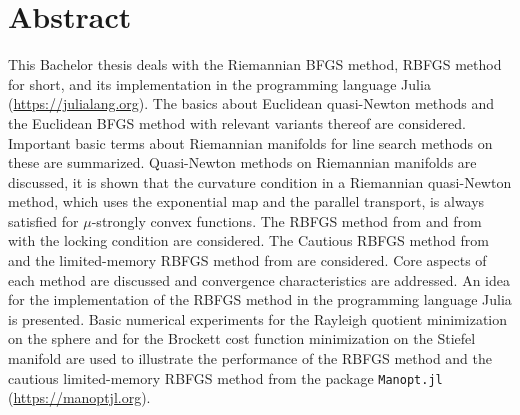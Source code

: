 \chapter*{Abstract}

This Bachelor thesis deals with the Riemannian BFGS method, RBFGS method for short, and its implementation in the programming language Julia (\url{https://julialang.org}). The basics about Euclidean quasi-Newton methods and the Euclidean BFGS method with relevant variants thereof are considered. Important basic terms about Riemannian manifolds for line search methods on these are summarized. Quasi-Newton methods on Riemannian manifolds are discussed, it is shown that the curvature condition in a Riemannian quasi-Newton method, which uses the exponential map and the parallel transport, is always satisfied for $\mu$-strongly convex functions. The RBFGS method from \cite{Qi:2011} and from \cite{HuangGallivanAbsil:2015} with the locking condition are considered. The Cautious RBFGS method from \cite{HuangAbsilGallivan:2018} and the limited-memory RBFGS method from \cite{HuangGallivanAbsil:2015} are considered. Core aspects of each method are discussed and convergence characteristics are addressed. An idea for the implementation of the RBFGS method in the programming language Julia is presented. Basic numerical experiments for the Rayleigh quotient minimization on the sphere and for the Brockett cost function minimization on the Stiefel manifold are used to illustrate the performance of the RBFGS method and the cautious limited-memory RBFGS method from the package \lstinline!Manopt.jl! (\url{https://manoptjl.org}).